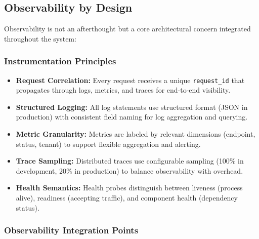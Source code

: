 \documentclass[a4paper,twoside]{sapthesis}
\begin{document}
\subsection{Observability by Design}
\label{subsec:observability-by-design}

Observability is not an afterthought but a core architectural concern integrated throughout the system:

\subsubsection{Instrumentation Principles}

\begin{itemize}
    \item \textbf{Request Correlation:} Every request receives a unique \texttt{request\_id} that propagates through logs, metrics, and traces for end-to-end visibility.
    
    \item \textbf{Structured Logging:} All log statements use structured format (JSON in production) with consistent field naming for log aggregation and querying.
    
    \item \textbf{Metric Granularity:} Metrics are labeled by relevant dimensions (endpoint, status, tenant) to support flexible aggregation and alerting.
    
    \item \textbf{Trace Sampling:} Distributed traces use configurable sampling (100\% in development, 20\% in production) to balance observability with overhead.
    
    \item \textbf{Health Semantics:} Health probes distinguish between liveness (process alive), readiness (accepting traffic), and component health (dependency status).
\end{itemize}

\subsubsection{Observability Integration Points}
\end{document}
